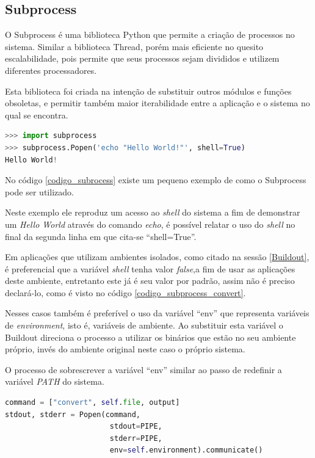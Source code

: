 \subsection{Subprocess}

O Subprocess é uma biblioteca Python que permite a criação de processos no sistema. Similar a biblioteca Thread, porém mais eficiente no quesito escalabilidade, pois permite que seus processos sejam divididos e utilizem diferentes processadores. 

Esta biblioteca foi criada na intenção de substituir outros módulos e funções obsoletas, e permitir também maior iterabilidade entre a aplicação e o sistema no qual se encontra.

{\singlespace
\begin{lstlisting}[caption=Exemplo de uso do Subprocess,language=python,label={codigo_subrocess}]
>>> import subprocess
>>> subprocess.Popen('echo "Hello World!"', shell=True)
Hello World!
\end{lstlisting}
}

No código \ref{codigo_subrocess} existe um pequeno exemplo de como o Subprocess pode ser utilizado.

Neste exemplo ele reproduz um acesso ao \textit{shell} do sistema a fim de demonstrar um \textit{Hello World} através do comando \textit{echo}, é possível relatar o uso do \textit{shell} no final da segunda linha em que cita-se ``shell=True''.

Em aplicações que utilizam ambientes isolados, como citado na sessão \ref{Buildout}, é preferencial que a variável \textit{shell} tenha valor \textit{false},a fim de usar as aplicações deste ambiente, entretanto este já é seu valor por padrão, assim não é preciso declará-lo, como é visto no código \ref{codigo_subprocess_convert}.

Nesses casos também é preferível o uso da variável ``env'' que representa variáveis de \textit{environment}, isto é, variáveis de ambiente. Ao substituir esta variável o Buildout direciona o processo a utilizar os binários que estão no seu ambiente próprio, invés do ambiente original neste caso o próprio sistema.

O processo de sobrescrever a variável ``env'' similar ao passo de redefinir a variável \textit{PATH} do sistema.

{\singlespace
\begin{lstlisting}[caption=Exemplo de uso do Subprocess com \textit{PIPE} extraído do CloudOoo,language=python,label={codigo_subprocess_convert}]
command = ["convert", self.file, output]
stdout, stderr = Popen(command, 
                        stdout=PIPE,
                        stderr=PIPE,
                        env=self.environment).communicate()
\end{lstlisting}
}



